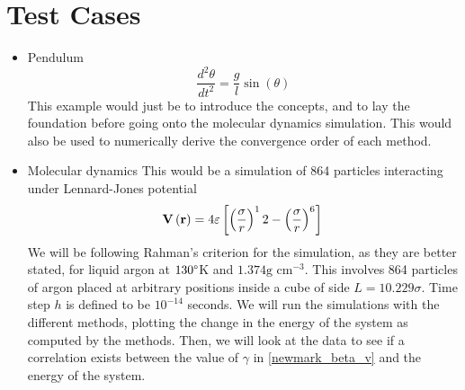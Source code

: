 \documentclass[a4paper, 11pt]{article}
\renewcommand{\vec}[1]{\mathbf{#1}}
\begin{document}
	\section{Test Cases}
\begin{itemize}
	\item Pendulum
$$
\frac{d^2\theta}{dt^2} = \frac{g}{l}\sin(\theta)
$$
This example would just be to introduce the concepts, and to lay the foundation before going onto the molecular dynamics simulation. This would also be used to numerically derive the convergence order of each method.
	\item Molecular dynamics
This would be a simulation of 864 particles interacting under Lennard-Jones potential
$$
\vec{V}\left(\vec{r}\right) = 4\varepsilon \left[ \left( \frac{\sigma}{r}\right)^12 - \left( \frac{\sigma}{r}\right)^6 \right] \\
$$
We will be following Rahman's \cite{Rahman1964} criterion for the simulation, as they are better stated, for liquid argon at $130\degree $K  and $1.374 \mbox{g cm}^{-3}$.  This involves 864 particles of argon placed at arbitrary positions inside a cube of side $ L = 10.229\sigma$. Time step $h$ is defined to be $10^{-14}$ seconds. We will run the simulations with the different methods, plotting the change in the energy of the system as computed by the methods. Then, we will look at the data to see if a correlation exists between the value of $\gamma$ in \eqref{newmark_beta_v} and the energy of the system.
\end{itemize}
\end{document}
